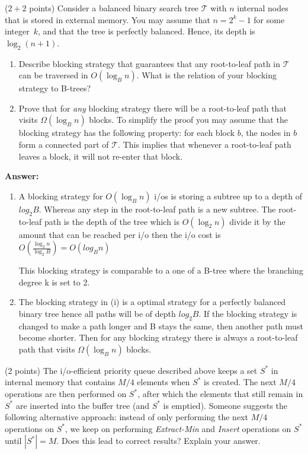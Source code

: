 \documentclass{article}
\newcommand{\tree}{\ensuremath{\mathcal{T}}}
\newcommand{\io}{{\sc i/o}\xspace}
\newcommand{\ios}{{\io}s\xspace}
\newcounter{rcounter}
\newenvironment{rlist}%
{\begin{list}{\setnr-\arabic{rcounter}}{\usecounter{rcounter}}}{\end{list}}
\begin{document}
    \begin{rlist}
        
        \item ($2 + 2$ points)
        Consider a balanced binary search tree $\tree$ with $n$ internal nodes that is stored in external memory. You may assume that $n=2^k-1$ for some integer~$k$, and that the tree is perfectly balanced.
        Hence, its depth is~$\log_2 (n+1)$.
        \begin{enumerate}
            \item[(i)]
            Describe blocking strategy that guarantees that any root-to-leaf path in $\tree$ can be traversed in $O(\log_B n)$. What is the relation of your blocking strategy to B-trees?
            \item[(ii)]
            Prove that for \emph{any} blocking strategy there will be a root-to-leaf path that visits $\Omega(\log_B n)$ blocks. To simplify the proof you may assume that the blocking strategy has the following property: for each block $b$, the nodes in $b$ form a connected part of $\tree$. This implies that whenever a root-to-leaf path leaves a block, it will not re-enter that block. 
        \end{enumerate}
        
        \textbf{Answer:}
        \begin{enumerate}
            \item[(i)]
            A blocking strategy for $O(\log_B n)$ \ios is storing a subtree up to a depth of $log_2 B$. Whereas any step in the root-to-leaf path is a new subtree. The root-to-leaf path is the depth of the tree which is $O(\log_2 n)$ divide it by the amount that can be reached per \io then the \io cost is $O(\frac{\log_2 n}{\log_2 B}) = O(log_B n)$
            
            
            This blocking strategy is comparable to a one of a B-tree where the branching degree k is set to 2.
            
            \item[(ii)]
            The blocking strategy in (i) is a optimal strategy for a perfectly balanced binary tree hence all paths will be of depth $log_2 B$. If the blocking strategy is changed to make a path longer and B stays the same, then another path must become shorter. Then for any blocking strategy there is always a root-to-leaf path that visits $\Omega(\log_B n)$ blocks.
        \end{enumerate} 
        \item (2 points)
        The \io-efficient priority queue described above keeps a set $S^*$ in internal memory that contains $M/4$ elements when $S^*$ is created. The next $M/4$ operations are then performed on $S^*$, after which the elements that still remain in $S^*$ are inserted into the buffer tree (and $S^*$ is emptied). Someone suggests the following alternative approach: instead of only performing the next $M/4$ operations on $S^*$, we keep on performing \emph{Extract-Min} and \emph{Insert} operations on $S^*$ until $|S^*|=M$. Does this lead to correct results? Explain your answer.
        

\end{rlist}
\end{document}
